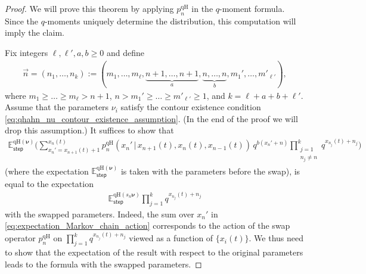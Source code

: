 \begin{proof}
	We will prove this theorem by applying
	$p_n^{\mathrm{qH}}$
	in the $q$-moment formula.
	Since the $q$-mo\-ments uniquely determine
	the distribution, this computation will imply the claim.
	
	Fix integers $\ell,\ell',a,b\ge0$ and define
	\begin{gather}
	\label{eq:n_a_b_notation}
	\vec n=(n_1,\ldots,n_k ):=(m_1,\ldots,m_\ell,\underbrace{n+1,\ldots,n+1 }_a,
 \underbrace{n,\ldots,n }_b,m_1',\ldots,m'_{\ell'}),
	\end{gather}
	where $m_1\ge \dots\ge m_\ell>n+1$,
	$n>m_1'\ge \dots\ge m'_{\ell'}\ge1$, and
	$k=\ell+a+b+\ell'$.
	Assume that the parameters $\nu_i$ satisfy
	the contour existence condition
	\eqref{eq:qhahn_nu_contour_existence_assumption}. (In the end
	of the proof we will drop this assumption.)
	It suffices to show that
	\begin{gather}
		\label{eq:expectation_Markov_chain_action}
		\mathbb{E}^{\mathrm{qH}(\boldsymbol\nu)}_{\mathsf{step}}
		\bigg(
			\sum_{x_n'=x_{n+1}(t)+1}^{x_n(t)}
			p_n^{\mathrm{qH}}
			(x_n'\,|\, x_{n+1}(t),x_n(t),x_{n-1}(t))
			\,q^{b(x_n'+n)}
			\prod_{\substack{j=1 \\n_j\ne n}}^{k}q^{x_{n_j}(t)+n_j}
		\biggr)
	\end{gather}
	(where the expectation
	$\mathbb{E}^{\mathrm{qH}(\boldsymbol\nu)}_{\mathsf{step}}$
	is taken with the
	parameters before the swap),
	is equal to the expectation
	\begin{gather}
		\label{eq:expectation_desired_for_qhahn}
		\mathbb{E}^{\mathrm{qH}(s_n\boldsymbol\nu)}_{\mathsf{step}}
		\prod_{j=1}^{k}q^{x_{n_j}(t)+n_j}
	\end{gather}
	with the swapped parameters.
	Indeed,
	the sum over $x_n'$
	in
	\eqref{eq:expectation_Markov_chain_action}
	corresponds to the action of the swap operator
	$p_n^{\mathrm{qH}}$
	on
	$\prod_{j=1}^{k}q^{x_{n_j}(t)+n_j}$ viewed as a function of $\{x_i(t)\}$.
	We thus need to show that the expectation of the result
	with respect to the original parameters
	leads to
	the formula with the swapped parameters.
	
	
	

\end{proof}
